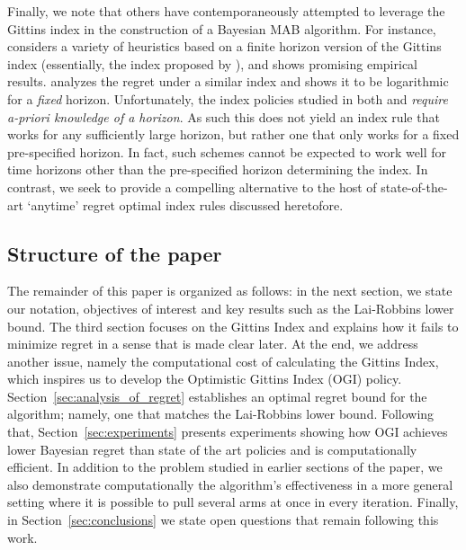 Finally, we note that others have contemporaneously attempted to leverage the Gittins index in the construction of a Bayesian MAB algorithm. For instance, \cite{kaufmann2016bayesian} considers a variety of heuristics based on a finite horizon version of the Gittins index (essentially, the index proposed by \cite{bradt1956sequential}), and shows promising empirical results. \cite{lattimore2016bayesregret} analyzes the regret under a similar index and shows it to be logarithmic for a {\em fixed} horizon. Unfortunately, the index policies studied in both \citep{kaufmann2016bayesian} and \citep{lattimore2016bayesregret} {\em require a-priori knowledge of a horizon}. As such this does not yield an index rule that works for any sufficiently large horizon, but rather one that only works for a fixed pre-specified horizon. In fact, such schemes cannot be expected to work well for time horizons other than the pre-specified horizon determining the index. In contrast, we seek to provide a compelling alternative to the host of state-of-the-art `anytime' regret optimal index rules discussed heretofore.


 


\subsection{Structure of the paper}
The remainder of this paper is organized as follows: in the next section, we state our notation, objectives of interest 
and key results such as the Lai-Robbins lower bound. The third section focuses on the Gittins Index and explains how it fails to minimize regret in a sense that is made clear later. At the end, we address another issue, namely the computational cost of calculating the Gittins Index, which inspires us to develop the Optimistic Gittins Index (OGI) policy. Section~\ref{sec:analysis_of_regret} establishes an optimal regret bound for the algorithm; namely, one that matches the Lai-Robbins lower bound. Following that, Section~\ref{sec:experiments} presents experiments showing how OGI achieves lower Bayesian regret than state of the art policies and is computationally efficient. In addition to the problem studied in earlier sections of the paper, we also demonstrate computationally the algorithm's effectiveness in a more general setting where it is possible to pull several arms at once in every iteration. Finally, in Section~\ref{sec:conclusions} we state open questions that remain following this work.
